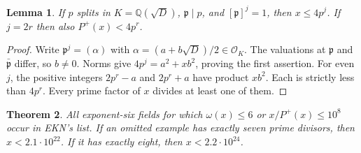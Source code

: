 \documentclass[11pt]{article}
\newcommand{\QQ}{\mathbb Q}
\newtheorem{theorem}{Theorem}\newtheorem{proposition}[theorem]{Proposition}
\newtheorem{lemma}[theorem]{Lemma}
\begin{document}
\begin{lemma}\label{norm}
If $p$ splits in $K=\QQ(\sqrt D)$, $\mathfrak p\mid p$, and $[\mathfrak p]^j=1$, then $x\le4p^j$. If $j=2r$ then also $P^+(x)<4p^r$.
\end{lemma}
\begin{proof}
Write $\mathfrak p^j=(\alpha)$ with $\alpha=(a+b\sqrt D)/2\in\mathcal O_K$. The valuations at $\mathfrak p$ and $\bar{\mathfrak p}$ differ, so $b\ne0$. Norms give $4p^j=a^2+xb^2$, proving the first assertion. For even $j$, the positive integers $2p^r-a$ and $2p^r+a$ have product $xb^2$. Each is strictly less than $4p^r$. Every prime factor of $x$ divides at least one of them.
\end{proof}

\begin{theorem}\label{six}
All exponent-six fields for which $\omega(x)\le6$ or $x/P^+(x)\le10^8$ occur in EKN's list. If an omitted example has exactly seven prime divisors, then $x<2.1\cdot10^{22}$. If it has exactly eight, then $x<2.2\cdot10^{24}$.
\end{theorem}
\end{document}
